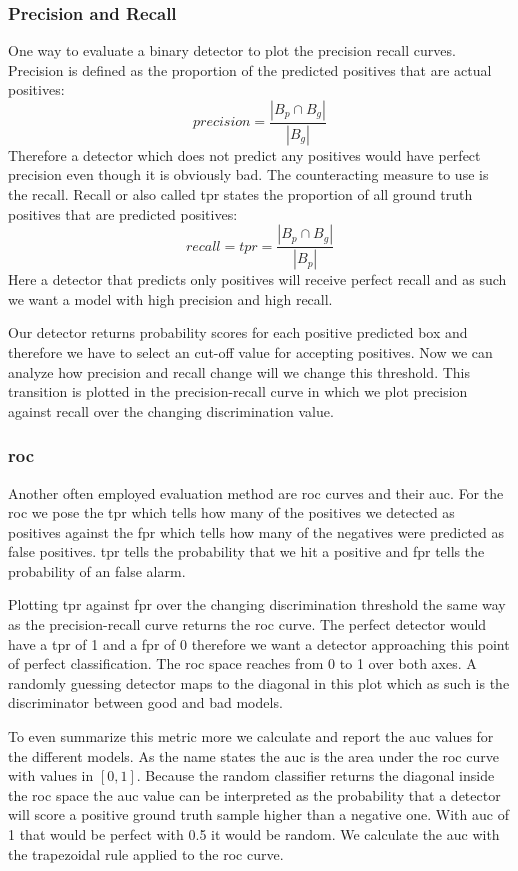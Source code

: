 \subsubsection{Precision and Recall}
One way to evaluate a binary detector to plot the precision recall curves. Precision is defined as the proportion of the predicted positives that are actual positives:
\begin{equation}
    \textit{precision} = \frac{|B_p \cap B_g|}{|B_g|}
\end{equation}
Therefore a detector which does not predict any positives would have perfect precision even though it is obviously bad. The counteracting measure to use is the recall. Recall or also called \gls{tpr} states the proportion of all ground truth positives that are predicted positives:
\begin{equation}
    \textit{recall} = \textit{tpr} = \frac{|B_p \cap B_g|}{|B_p|}
\end{equation}
Here a detector that predicts only positives will receive perfect recall and as such we want a model with high precision and high recall.

Our detector returns probability scores for each positive predicted box and therefore we have to select an cut-off value for accepting positives. Now we can analyze how precision and recall change will we change this threshold. This transition is plotted in the precision-recall curve in which we plot precision against recall over the changing discrimination value.

\subsubsection{\gls{roc}}
Another often employed evaluation method are \gls{roc} curves and their \gls{auc}. For the \gls{roc} we pose the \gls{tpr} which tells how many of the positives we detected as positives against the \gls{fpr} which tells how many of the negatives were predicted as false positives. \gls{tpr} tells the probability that we hit a positive and \gls{fpr} tells the probability of an false alarm.

Plotting \gls{tpr} against \gls{fpr} over the changing discrimination threshold the same way as the precision-recall curve returns the \gls{roc} curve. The perfect detector would have a \gls{tpr} of 1 and a \gls{fpr} of 0 therefore we want a detector approaching this point of perfect classification. The \gls{roc} space reaches from 0 to 1 over both axes. A randomly guessing detector maps to the diagonal in this plot which as such is the discriminator between good and bad models.

To even summarize this metric more we calculate and report the \gls{auc} values for the different models. As the name states the \gls{auc} is the area under the \gls{roc} curve with values in $[0, 1]$. Because the random classifier returns the diagonal inside the \gls{roc} space the \gls{auc} value can be interpreted as the probability that a detector will score a positive ground truth sample higher than a negative one. With \gls{auc} of 1 that would be perfect with 0.5 it would be random. We calculate the \gls{auc} with the trapezoidal rule applied to the \gls{roc} curve.
